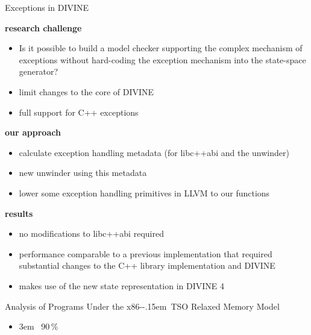\documentclass[aspectratio=169, fi]{paradise-slide}
\newcommand{\fcite}[1]{\emergencystretch 3em{\protect\NoHyper\cite{#1}}~\fullcite{#1}}
\newcommand{\xtso}{\mbox{x86-\kern-.15em TSO}\xspace}
\newenvironment{prespart}[1]{%
  \begin{frame}{}%
    \centering
      {\Large #1} \par\bigskip\bigskip%
}{%
  \end{frame}%
}
\begin{document}
\begin{frame}{Exceptions in DIVINE}

  \textbf{research challenge}
  \begin{itemize}
    \item Is it possible to build a model checker supporting the complex mechanism of exceptions
      without hard-coding the exception mechanism into the state-space generator?
    \pause
    \item limit changes to the core of DIVINE
    \item full support for C++ exceptions
  \end{itemize}
  \pause

  \bigskip
  \textbf{our approach}
  \begin{itemize}
    \item calculate exception handling metadata (for libc++abi and the unwinder)
    \item new unwinder using this metadata
    \item lower some exception handling primitives in LLVM to our functions
  \end{itemize}
  \pause

  \bigskip
  \textbf{results}
  \begin{itemize}
    \item no modifications to libc++abi required
    \item performance comparable to a previous implementation that required substantial changes to
      the C++ library implementation and DIVINE
    \item makes use of the new state representation in DIVINE 4
  \end{itemize}
\end{frame}

\begin{prespart}{Analysis of Programs Under the \xtso Relaxed Memory Model}
  \begin{itemize}
    \item \fcite{SB2018x86tso} \hfill 90\,\%
  \end{itemize}
\end{prespart}
\end{document}
